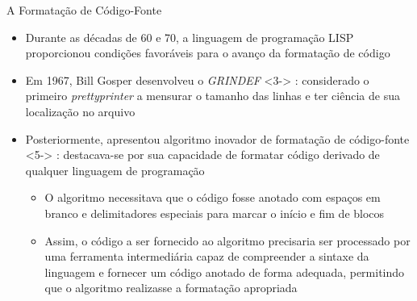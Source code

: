 \documentclass
  [ aspectratio=169,
    english,
    hyperref={citecolor=blue,colorlinks=true,linkcolor=blue,urlcolor=blue},
    brazil]
  {beamer}
\begin{document}
  \begin{frame}{A Formatação de Código-Fonte}
    \begin{itemize}
      \item<1-> Durante as décadas de 60 e 70, a linguagem de programação LISP
                proporcionou condições favoráveis para o avanço da formatação
                de código \cite[2]{yelland-2015-new}
      \item<2-> Em 1967, Bill Gosper desenvolveu o \textit{GRINDEF}%
                \onslide
                  <3->
                  {%
                    : considerado o primeiro \textit{prettyprinter} a mensurar
                    o tamanho das linhas e ter ciência de sua localização no
                    arquivo
                    \cites
                      {gosper-2023-twubblesome}
                      {griesemer-2022-cultural}}
      \item<4-> Posteriormente, \textcite{oppen-1980-prettyprinting} apresentou
                algoritmo inovador de formatação de código-fonte%
                \onslide
                  <5->
                  {%
                    : destacava-se por sua capacidade de formatar código
                    derivado de qualquer linguagem de programação}
                \begin{itemize}
                  \item<6-> O algoritmo necessitava que o código fosse anotado
                            com espaços em branco e delimitadores especiais
                            para marcar o início e fim de blocos
                  \item<7-> Assim, o código a ser fornecido ao algoritmo
                            precisaria ser processado por uma ferramenta
                            intermediária capaz de compreender a sintaxe da
                            linguagem e fornecer um código anotado de forma
                            adequada, permitindo que o algoritmo realizasse a
                            formatação apropriada
                \end{itemize}
    \end{itemize}
  \end{frame}
\end{document}
